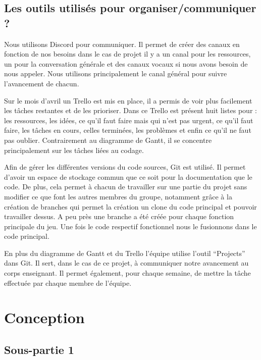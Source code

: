 \documentclass[a4paper,12pt]{article}
\begin{document}
\subsection{Les outils utilisés pour organiser/communiquer ?}
Nous utilisons Discord pour communiquer. Il permet de créer des canaux en fonction de nos besoins dans le cas de projet il y a un canal pour les ressources, un pour la conversation générale et des canaux vocaux si nous avons besoin de nous appeler. Nous utilisons principalement le canal général pour suivre l’avancement de chacun.

Sur le mois d’avril un Trello est mis en place, il a permis de voir plus facilement les tâches restantes et de les prioriser. Dans ce Trello est présent huit listes pour : les ressources, les idées, ce qu’il faut faire mais qui n’est pas urgent, ce qu’il faut faire, les tâches en cours, celles terminées, les problèmes et enfin ce qu’il ne faut pas oublier. Contrairement au diagramme de Gantt, il se concentre principalement sur les tâches liées au codage.

Afin de gérer les différentes versions du code sources, Git est utilisé. Il permet d’avoir un espace de stockage commun que ce soit pour la documentation que le code. De plus, cela permet à chacun de travailler sur une partie du projet sans modifier ce que font les autres membres du groupe, notamment grâce à la création de branches qui permet la création un clone du code principal et pouvoir travailler dessus. A peu près une branche a été créée pour chaque fonction principale du jeu. Une fois le code respectif fonctionnel nous le fusionnons dans le code principal.

En plus du diagramme de Gantt et du Trello l’équipe utilise l’outil “Projects” dans Git. Il sert, dans le cas de ce projet, à communiquer notre avancement au corps enseignant. Il permet également, pour chaque semaine, de mettre la tâche effectuée par chaque membre de l’équipe.



\section{Conception}

\subsection{Sous-partie 1}
\end{document}
